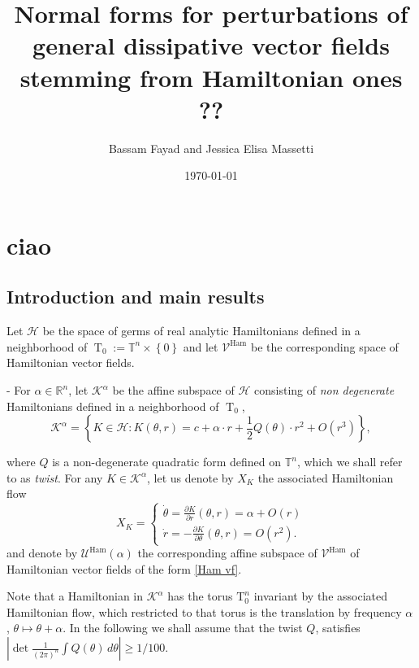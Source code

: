 \documentclass[oneside, 11pt]{amsbook}
\newcommand{\set}[1]{{\left\{#1\right\}}}
\newcommand{\normal}{\mathrm}
\newcommand{\T}{\mathbb{T}}
\newcommand{\R}{\mathbb{R}}
\newcommand{\teta}{\theta}
\newcommand{\eqsys}[1]{{\left\{\begin{array}{ll}#1\end{array}\right.}}
\newcommand{\Uh}{\mathcal{U}^{\operatorname{Ham}}}
\newcommand{\Vh}{\mathcal{V}^{\operatorname{Ham}}}
\newcommand{\cH}{{\mathcal H}}
\newcommand{\cK}{{\mathcal K}}
\newcommand{\0}{{(0)}}
\newcommand{\3}{{(3)}}
\numberwithin{equation}{section}
\numberwithin{defn}{section}
\numberwithin{prop}{section}
\numberwithin{cor}{section}
\numberwithin{lemma}{section}
\numberwithin{rmk}{section}
\numberwithin{corollary}{section}
\newcommand{\To}{\operatorname{T}_0}
\begin{document}
\date{\today}
\author{Bassam Fayad and Jessica Elisa Massetti}


\title[symplectic Vs dissipation]{Normal forms for perturbations of general dissipative vector fields stemming from Hamiltonian ones ??}
\begin{abstract}

\end{abstract}

\maketitle
\tableofcontents

\chapter{ciao}
\section{Introduction and main results}


Let $\cH$ be the space of germs of real analytic Hamiltonians defined in a neighborhood of $\To :=\T^n\times\set{0}$ and let $\Vh$ be the corresponding space of Hamiltonian vector fields.

- For $\alpha\in\R^n$, let $\cK^\alpha$ be the affine subspace of $\cH$ consisting of \emph{non degenerate} Hamiltonians defined in a neighborhood of $\To$, $$\mathcal{K}^\alpha=\set{K\in\mathcal{H}: K(\teta,r)= c + \alpha\cdot r + \frac{1}{2}Q(\teta)\cdot r^2 + O(r^3)},$$

where $Q$ is a non-degenerate quadratic form defined on $\T^n$, which we shall refer to as \emph{twist}.
For any $K\in\cK^\alpha$, let us denote by $X_K$ the associated Hamiltonian flow 
\begin{equation}\label{Ham vf}
	X_K=\eqsys{\dot\teta = \frac{\partial K}{\partial r}(\teta,r)= \alpha + O(r)\\
		\dot{r} = -\frac{\partial K}{\partial \teta}(\teta,r)= O(r^2).} 
\end{equation}
and denote by $\Uh(\alpha)$ the corresponding affine subspace of $\Vh$ of Hamiltonian vector fields of the form \eqref{Ham vf}.

Note that a Hamiltonian in $\mathcal{K}^\alpha$  has the torus $\normal{T}^n_0$  invariant by the associated Hamiltonian flow, which restricted to that torus is the translation by  frequency $\alpha$, $\teta \mapsto \teta + \alpha$.
In the following we shall assume that the twist $Q$, satisfies $\left|\det\frac{1}{(2\pi)^n}\int Q(\teta)\,d\teta\right| \geq 1/100$.
\end{document}
